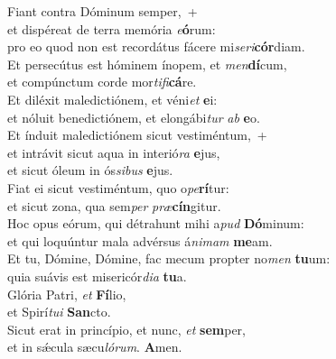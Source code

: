 \evenverse Fiant contra Dóminum semper,~+\\\evenverse  et dispéreat de terra memória \textit{e}\textbf{ó}rum:~\*\\
\evenverse pro eo quod non est recordátus fácere mi\textit{se}\textit{ri}\textbf{cór}diam.\\
\oddverse Et persecútus est hóminem ínopem, et \textit{men}\textbf{dí}cum,~\*\\
\oddverse et compúnctum corde mor\textit{ti}\textit{fi}\textbf{cá}re.\\
\evenverse Et diléxit maledictiónem, et véni\textit{et} \textbf{e}i:~\*\\
\evenverse et nóluit benedictiónem, et elongábi\textit{tur} \textit{ab} \textbf{e}o.\\
\oddverse Et índuit maledictiónem sicut vestiméntum,~+\\
\oddverse  et intrávit sicut aqua in interió\textit{ra} \textbf{e}jus,~\*\\
\oddverse et sicut óleum in ós\textit{si}\textit{bus} \textbf{e}jus.\\
\evenverse Fiat ei sicut vestiméntum, quo o\textit{pe}\textbf{rí}tur:~\*\\
\evenverse et sicut zona, qua sem\textit{per} \textit{præ}\textbf{cín}gitur.\\
\oddverse Hoc opus eórum, qui détrahunt mihi a\textit{pud} \textbf{Dó}minum:~\*\\
\oddverse et qui loquúntur mala advérsus á\textit{ni}\textit{mam} \textbf{me}am.\\
\evenverse Et tu, Dómine, Dómine, fac mecum propter no\textit{men} \textbf{tu}um:~\*\\
\evenverse quia suávis est misericór\textit{di}\textit{a} \textbf{tu}a.\\
\oddverse Glória Patri, \textit{et} \textbf{Fí}lio,~\*\\
\oddverse et Spirí\textit{tu}\textit{i} \textbf{San}cto.\\
\evenverse Sicut erat in princípio, et nunc, \textit{et} \textbf{sem}per,~\*\\
\evenverse et in sǽcula sæcu\textit{ló}\textit{rum}. \textbf{A}men.\\
